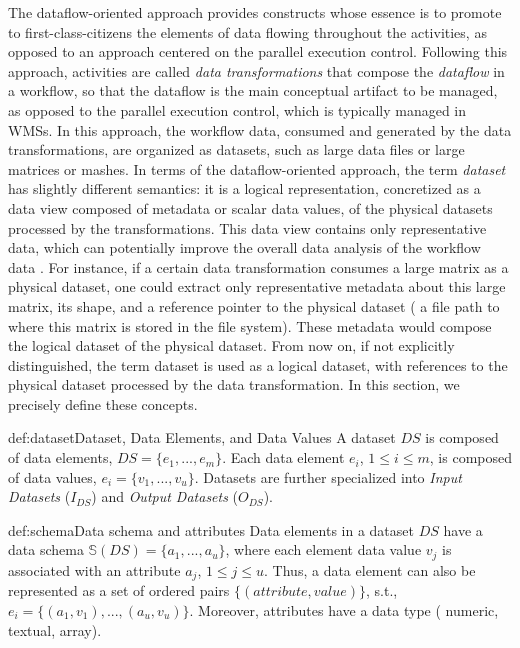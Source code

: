 The dataflow-oriented approach provides constructs whose essence is to promote to first-class-citizens
the elements of data flowing throughout the
activities, as opposed to an approach centered on the parallel execution control.
Following this approach, activities are called \textit{data transformations} that compose the \textit{dataflow} in a workflow, so that the dataflow is the main conceptual artifact to be managed, as opposed to the parallel execution control, which is typically managed in WMSs.
In this approach, the workflow data, consumed and generated by the data transformations, are organized as datasets, such as large data files or large matrices or mashes.
In terms of the dataflow-oriented approach, the term \textit{dataset} has slightly different semantics: it is a logical representation, concretized as a data view composed of metadata or scalar data values, of the physical datasets processed by the transformations.
This data view contains only representative data, which can potentially improve the overall data analysis of the workflow data \cite{Silva2017Raw, souza_keeping_2019}.
For instance, if a certain data transformation consumes a large matrix as a physical dataset, one could extract only representative metadata about this large matrix, its shape, and a reference pointer to the physical dataset (\eg{} a file path to where this matrix is stored in the file system). These metadata would compose the logical dataset of the physical dataset. From now on, if not explicitly distinguished, the term dataset is used as a logical dataset, with references to the physical dataset processed by the data transformation.
In this section, we precisely define these concepts.

\begin{mydef}{def:dataset}{Dataset, Data Elements, and Data Values}
A dataset $DS$ is composed of data elements, \ie{} $DS=\{e_1,...,e_m\}$.
Each data element $e_i$, $1 \leq i \leq m$, is composed of data values, \ie{} $e_i=\{v_1,...,v_u\}$.
Datasets are further specialized into \textit{Input Datasets} ($I_{DS}$) and \textit{Output Datasets} ($O_{DS}$).
\end{mydef}

\begin{mydef}{def:schema}{Data schema and attributes}
Data elements in a dataset $DS$ have a data schema $\mathbb{S}(DS) = \{a_1,...,a_u\}$,
where each element data value $v_j$  is associated with an attribute $a_j$, $1 \leq j \leq u $.
Thus, a data element can also be represented as a set of ordered pairs $\{(attribute,value)\}$, s.t.,
$e_i = \{(a_1,v_1),..., (a_u,v_u)\}$.
Moreover, attributes have a data type (\eg{} numeric, textual, array).
\end{mydef}

